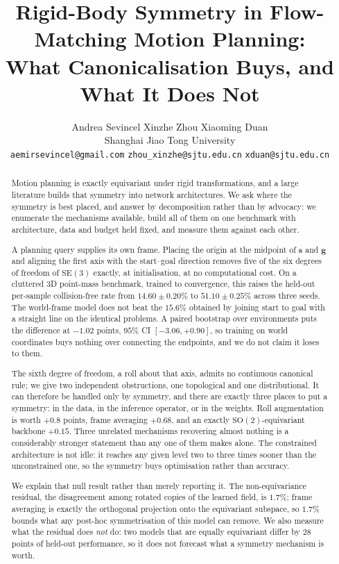 \documentclass[10pt,twocolumn,letterpaper]{article}
\title{\vspace{-1.2em}\bfseries\Large
Rigid-Body Symmetry in Flow-Matching Motion Planning:\\
What Canonicalisation Buys, and What It Does Not}
\author{Andrea Sevincel \qquad Xinzhe Zhou \qquad Xiaoming Duan\\[2pt]
{\normalsize Shanghai Jiao Tong University}\\[1pt]
{\normalsize\texttt{aemirsevincel@gmail.com} \quad
\texttt{zhou\_xinzhe@sjtu.edu.cn} \quad \texttt{xduan@sjtu.edu.cn}}}
\date{}
\theoremstyle{plain}
\newcommand{\svec}{\mathbf{s}}
\newcommand{\gvec}{\mathbf{g}}
\newcommand{\SE}{\mathrm{SE}(3)}
\begin{document}
\maketitle

\begin{abstract}
\noindent
Motion planning is exactly equivariant under rigid transformations, and a large
literature builds that symmetry into network architectures. We ask where the
symmetry is best placed, and answer by decomposition rather than by advocacy:
we enumerate the mechanisms available, build all of them on one benchmark with
architecture, data and budget held fixed, and measure them against each other.

A planning query supplies its own frame. Placing the origin at the midpoint of
$\svec$ and $\gvec$ and aligning the first axis with the start--goal direction
removes five of the six degrees of freedom of $\SE$ exactly, at initialisation,
at no computational cost. On a cluttered 3D point-mass benchmark, trained to
convergence, this raises the held-out per-sample collision-free rate from
$14.60\pm0.20\%$ to $51.10\pm0.25\%$ across three seeds. The world-frame model
does not beat the $15.6\%$ obtained by joining start to goal with a straight line
on the identical problems. A paired bootstrap over environments puts the
difference at $-1.02$ points, $95\%$ CI $[-3.06, +0.90]$, so training on world
coordinates buys nothing over connecting the endpoints, and we do not claim it
loses to them.

The sixth degree of freedom, a roll about that axis, admits no continuous
canonical rule; we give two independent obstructions, one topological and one
distributional. It can therefore be handled only by symmetry, and there are
exactly three places to put a symmetry: in the data, in the inference operator,
or in the weights. Roll augmentation is worth $+0.8$ points, frame averaging
$+0.68$, and an exactly $\mathrm{SO}(2)$-equivariant backbone $+0.15$. Three
unrelated mechanisms recovering almost nothing is a considerably stronger
statement than any one of them makes alone. The constrained architecture is not
idle: it reaches any given level two to three times sooner than the
unconstrained one, so the symmetry buys optimisation rather than accuracy.

We explain that null result rather than merely reporting it. The
non-equivariance residual, the disagreement among rotated copies of the learned
field, is $1.7\%$; frame averaging is exactly the orthogonal projection onto the
equivariant subspace, so $1.7\%$ bounds what any post-hoc symmetrisation of this
model can remove. We also measure what the residual does \emph{not} do: two models
that are equally equivariant differ by $28$ points of held-out performance, so it
does not forecast what a symmetry mechanism is worth.


\end{abstract}
\end{document}
